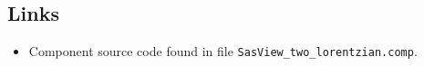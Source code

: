 \subsection*{Links}
\begin{itemize}
  \item Component source code found in file \texttt{SasView\_two\_lorentzian.comp}.
\end{itemize}
